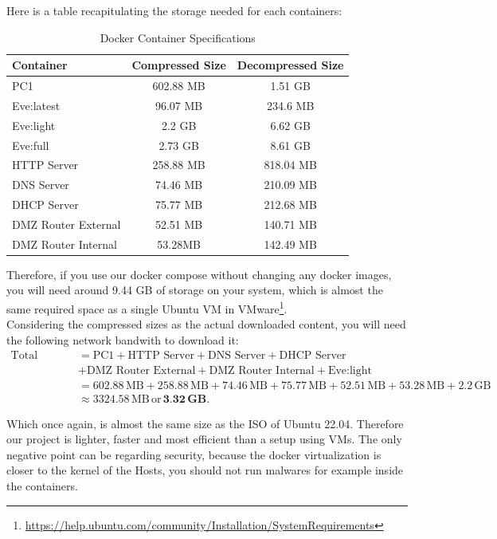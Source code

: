 \documentclass[a4paper,11pt,singlespacing]{article}
\begin{document}
Here is a table recapitulating the storage needed for each containers:
\begin{table}[h]
  \centering
  \begin{tabular}{|l|c|c|}
    \hline
    \textbf{Container} & \textbf{Compressed Size} & \textbf{Decompressed Size}\\
    \hline
    PC1 & 602.88 MB & 1.51 GB \\
    Eve:latest & 96.07 MB & 234.6 MB \\
    Eve:light & 2.2 GB & 6.62 GB \\
    Eve:full & 2.73 GB & 8.61 GB \\
    HTTP Server & 258.88 MB & 818.04 MB \\
    DNS Server & 74.46 MB & 210.09 MB \\
    DHCP Server & 75.77 MB & 212.68 MB \\
    DMZ Router External & 52.51 MB & 140.71 MB \\
    DMZ Router Internal & 53.28MB  & 142.49 MB \\
    \hline
  \end{tabular}
  \caption{Docker Container Specifications}
  \label{tab:specs}
\end{table}

Therefore, if you use our docker compose without changing any docker images, you will need around 9.44 GB of storage on your system, which is almost the same required space as a single Ubuntu VM in VMware\footnote{\url{https://help.ubuntu.com/community/Installation/SystemRequirements}}.\\

Considering the compressed sizes as the actual downloaded content, you will need the following network bandwith to download it:
\begin{align*}
\text{Total Compressed Size} & = \text{PC1} + \text{HTTP Server} + \text{DNS Server} + \text{DHCP Server}\\
& + \text{DMZ Router External} + \text{DMZ Router Internal} + \text{Eve:light} \\
& = 602.88 \, \text{MB} + 258.88 \, \text{MB} + 74.46 \, \text{MB} + 75.77 \, \text{MB} + 52.51 \, \text{MB} + 53.28 \, \text{MB} + 2.2 \, \text{GB} \\
& \approx 3324.58 \, \text{MB} \, \text{or} \, \textbf{3.32} \, \textbf{GB}.
\end{align*}

Which once again, is almost the same size as the ISO of Ubuntu 22.04. Therefore our project is lighter, faster and most efficient than a setup using VMs. The only negative point can be regarding security, because the docker virtualization is closer to the kernel of the Hosts, you should not run malwares for example inside the containers.
\end{document}
